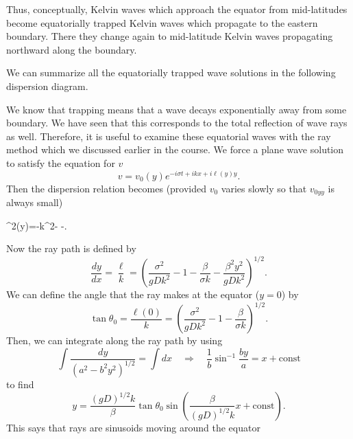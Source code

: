 
Thus, conceptually, Kelvin waves which approach the equator from mid-latitudes become
equatorially trapped Kelvin waves which propagate to the eastern boundary. There they
change again to mid-latitude Kelvin waves propagating northward along the boundary.

We can summarize all the equatorially trapped wave solutions in the following
dispersion diagram.


\sourcepagebreak

We know that trapping means that a wave decays exponentially away from some boundary.
We have seen that this corresponds to the total reflection of wave rays as well.
Therefore, it is useful to examine these equatorial waves with the ray method which we
discussed earlier in the course. We force a plane wave solution to satisfy the equation
for $v$
\[
	v=v_0(y)e^{-i\sigma t+ikx+i\ell(y)y}.
\]
Then the dispersion relation becomes (provided $v_0$ varies slowly so that $v_{0yy}$ is
always small)
\begin{waveequation}
	\ell^2(y)=-k^2-
	-.
\end{waveequation}
Now the ray path is defined by
\[
	\frac{dy}{dx}=\frac{\ell}{k}
	=\left(
	\frac{\sigma^2}{gDk^2}-1-\frac{\beta}{\sigma k}
	-\frac{\beta^2y^2}{gDk^2}
	\right)^{1/2}.
\]
We can define the angle that the ray makes at the equator ($y=0$) by
\[
	\tan\theta_0=\frac{\ell(0)}{k}
	=\left(
	\frac{\sigma^2}{gDk^2}-1-\frac{\beta}{\sigma k}
	\right)^{1/2}.
\]
Then, we can integrate along the ray path by using
\[
	\int\frac{dy}{(a^2-b^2y^2)^{1/2}}
	=\int dx
	\quad\Rightarrow\quad
	\frac{1}{b}\sin^{-1}\frac{by}{a}=x+\mathrm{const}
\]
to find
\[
	y=\frac{(gD)^{1/2}k}{\beta}\tan\theta_0
	\sin\left(
	\frac{\beta}{(gD)^{1/2}k}x+\mathrm{const}
	\right).
\]
This says that rays are sinusoids moving around the equator

